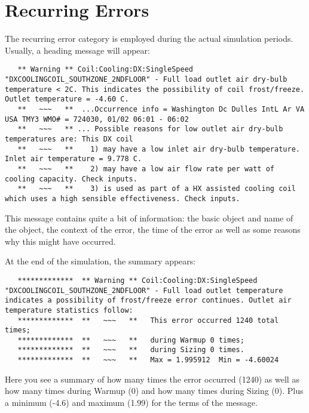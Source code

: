 \section{Recurring Errors}\label{recurring-errors}

The recurring error category is employed during the actual simulation periods. Usually, a heading message will appear:

\begin{lstlisting}
   ** Warning ** Coil:Cooling:DX:SingleSpeed "DXCOOLINGCOIL_SOUTHZONE_2NDFLOOR" - Full load outlet air dry-bulb temperature < 2C. This indicates the possibility of coil frost/freeze. Outlet temperature = -4.60 C.
   **   ~~~   **  ...Occurrence info = Washington Dc Dulles IntL Ar VA USA TMY3 WMO# = 724030, 01/02 06:01 - 06:02
   **   ~~~   ** ... Possible reasons for low outlet air dry-bulb temperatures are: This DX coil
   **   ~~~   **    1) may have a low inlet air dry-bulb temperature. Inlet air temperature = 9.778 C.
   **   ~~~   **    2) may have a low air flow rate per watt of cooling capacity. Check inputs.
   **   ~~~   **    3) is used as part of a HX assisted cooling coil which uses a high sensible effectiveness. Check inputs.
\end{lstlisting}

This message contains quite a bit of information: the basic object and name of the object, the context of the error, the time of the error as well as some reasons why this might have occurred.

At the end of the simulation, the summary appears:

\begin{lstlisting}
   *************  ** Warning ** Coil:Cooling:DX:SingleSpeed "DXCOOLINGCOIL_SOUTHZONE_2NDFLOOR" - Full load outlet temperature indicates a possibility of frost/freeze error continues. Outlet air temperature statistics follow:
   *************  **   ~~~   **   This error occurred 1240 total times;
   *************  **   ~~~   **   during Warmup 0 times;
   *************  **   ~~~   **   during Sizing 0 times.
   *************  **   ~~~   **   Max = 1.995912  Min = -4.60024
\end{lstlisting}

Here you see a summary of how many times the error occurred (1240) as well as how many times during Warmup (0) and how many times during Sizing (0). Plus a minimum (-4.6) and maximum (1.99) for the terms of the message.
